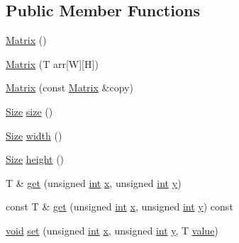 \subsection*{Public Member Functions}
\begin{DoxyCompactItemize}
\item 
\hyperlink{structmc_1_1_matrix_a1c0107dd6bf262a240653fcc2650fb2b}{Matrix} ()
\item 
\hyperlink{structmc_1_1_matrix_a4bceda87f2c87294d4a631b2229dff8f}{Matrix} (T arr\mbox{[}W\mbox{]}\mbox{[}H\mbox{]})
\item 
\hyperlink{structmc_1_1_matrix_a16a62a958729f121805a76d43554bc69}{Matrix} (const \hyperlink{structmc_1_1_matrix}{Matrix} \&copy)
\item 
\hyperlink{namespacemc_ad1c06461067735b3b17e0df612532c4e}{Size} \hyperlink{structmc_1_1_matrix_ac7b493824ba976376aeac2de193f41f2}{size} ()
\item 
\hyperlink{namespacemc_ad1c06461067735b3b17e0df612532c4e}{Size} \hyperlink{structmc_1_1_matrix_af50d7f0d342318246a98fb7e01ae4989}{width} ()
\item 
\hyperlink{namespacemc_ad1c06461067735b3b17e0df612532c4e}{Size} \hyperlink{structmc_1_1_matrix_ad9eaa721ec2db5bb588ae12e6c2a78b3}{height} ()
\item 
T \& \hyperlink{structmc_1_1_matrix_ad4c47d5e7ef5c88264b06554a64f7ae7}{get} (unsigned \hyperlink{_s_d_l__thread_8h_a6a64f9be4433e4de6e2f2f548cf3c08e}{int} \hyperlink{_s_d_l__opengl_8h_ad0e63d0edcdbd3d79554076bf309fd47}{x}, unsigned \hyperlink{_s_d_l__thread_8h_a6a64f9be4433e4de6e2f2f548cf3c08e}{int} \hyperlink{_s_d_l__opengl_8h_a1675d9d7bb68e1657ff028643b4037e3}{y})
\item 
const T \& \hyperlink{structmc_1_1_matrix_aa8cca780babd0f83797e05400538ad69}{get} (unsigned \hyperlink{_s_d_l__thread_8h_a6a64f9be4433e4de6e2f2f548cf3c08e}{int} \hyperlink{_s_d_l__opengl_8h_ad0e63d0edcdbd3d79554076bf309fd47}{x}, unsigned \hyperlink{_s_d_l__thread_8h_a6a64f9be4433e4de6e2f2f548cf3c08e}{int} \hyperlink{_s_d_l__opengl_8h_a1675d9d7bb68e1657ff028643b4037e3}{y}) const 
\item 
\hyperlink{_s_d_l__opengles2__gl2ext_8h_ae5d8fa23ad07c48bb609509eae494c95}{void} \hyperlink{structmc_1_1_matrix_a7a4970e6c6d4c277cd7d15cffb3e470f}{set} (unsigned \hyperlink{_s_d_l__thread_8h_a6a64f9be4433e4de6e2f2f548cf3c08e}{int} \hyperlink{_s_d_l__opengl_8h_ad0e63d0edcdbd3d79554076bf309fd47}{x}, unsigned \hyperlink{_s_d_l__thread_8h_a6a64f9be4433e4de6e2f2f548cf3c08e}{int} \hyperlink{_s_d_l__opengl_8h_a1675d9d7bb68e1657ff028643b4037e3}{y}, T \hyperlink{_s_d_l__opengl__glext_8h_a8ad81492d410ff2ac11f754f4042150f}{value})
\end{DoxyCompactItemize}
